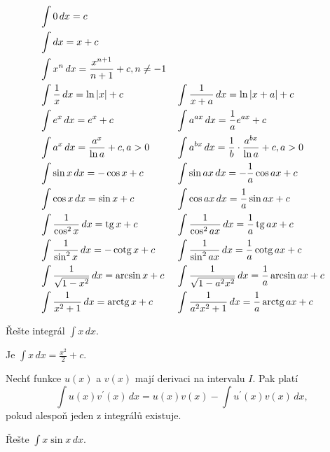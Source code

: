 \begin{pozn}
\begin{align*}
    &\int 0\, dx = c & & \, \\
    &\int dx = x+c & & \, \\
    &\int x^n \, dx = \frac{x^{n+1}}{n+1}+c, n\ne -1 & & \, \\
    &\int \frac{1}{x} \, dx = \operatorname{ln} |x| + c & & \int \frac{1}{x+a}\, dx = \operatorname{ln} |x+a|+c \\
    &\int e^x\, dx = e^x+c & & \int a^{ax}\, dx = \frac{1}{a}e^{ax}+c \\
    &\int a^x \, dx = \frac{a^x}{\operatorname{ln} a} + c, a >0 & & \int a^{bx} \, dx = \frac{1}{b}\cdot \frac{a^{bx}}{\operatorname{ln} a}+c, a>0\\
    &\int \sin x \, dx = -\cos x + c & & \int \sin ax \, dx = -\frac{1}{a}\cos ax+c \\
    &\int \cos x \, dx = \sin x +c & & \int \cos ax\, dx = \frac{1}{a}\sin ax + c \\
    &\int \frac{1}{\cos^2 x}\, dx = \operatorname{tg} x + c & & \int \frac{1}{\cos^2 ax}\, dx=\frac{1}{a}\operatorname{tg} ax+c\\
    &\int \frac{1}{\sin^2 x} \, dx = -\operatorname{cotg} x+c & & \int \frac{1}{\sin^2 ax}\, dx = \frac{1}{a}\operatorname{cotg} ax+c \\
    &\int \frac{1}{\sqrt{1-x^2} }\, dx = \arcsin x + c & & \int \frac{1}{\sqrt{1-a^2x^2} }\, dx = \frac{1}{a}\arcsin ax+c \\
    &\int \frac{1}{x^2+1}\, dx = \operatorname{arctg} x + c & & \int \frac{1}{a^2x^2 + 1}\, dx = \frac{1}{a}\operatorname{arctg} ax + c
\end{align*}
\end{pozn}

\begin{priklad}
Řešte integrál $\int x \, dx.$
\end{priklad}

\begin{reseni}
Je $\int x \, dx=\frac{x^2}{2}+c.$
\end{reseni}

\begin{veta}
Nechť funkce $u(x) $ a $v(x)$ mají derivaci na intervalu $I$. Pak platí
$$\int u(x)v^\prime (x) \, dx = u(x) v(x) - \int u^\prime (x) v(x) \, dx,$$
pokud alespoň jeden z integrálů existuje.
\end{veta}

\begin{priklad}
Řešte $\int x \sin x \, dx $.
\end{priklad}

